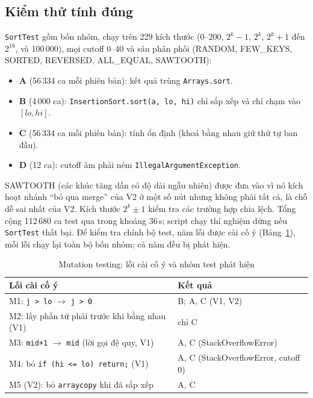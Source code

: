 \documentclass[11pt,a4paper]{article}
\begin{document}
\subsection{Kiểm thử tính đúng}
\texttt{SortTest} gồm bốn nhóm, chạy trên 229 kích thước (0--200, $2^k-1$, $2^k$, $2^k+1$ đến $2^{16}$, và
100\,000), mọi cutoff 0--40 và sáu phân phối (RANDOM, FEW\_KEYS, SORTED, REVERSED, ALL\_EQUAL, SAWTOOTH):
\begin{itemize}
\item \textbf{A} (56\,334 ca mỗi phiên bản): kết quả trùng \texttt{Arrays.sort}.
\item \textbf{B} (4\,000 ca): \texttt{InsertionSort.sort(a, lo, hi)} chỉ sắp xếp và chỉ chạm vào $[lo, hi]$.
\item \textbf{C} (56\,334 ca mỗi phiên bản): tính ổn định (khoá bằng nhau giữ thứ tự ban đầu).
\item \textbf{D} (12 ca): cutoff âm phải ném \texttt{IllegalArgumentException}.
\end{itemize}
SAWTOOTH (các khúc tăng dần có độ dài ngẫu nhiên) được đưa vào vì nó kích hoạt nhánh ``bỏ qua merge''
của V2 ở một số nút nhưng không phải tất cả, là chỗ dễ sai nhất của V2. Kích thước $2^k \pm 1$ kiểm tra
các trường hợp chia lệch. Tổng cộng 112\,680 ca test qua trong khoảng 36\,s; script chạy thí nghiệm dừng
nếu \texttt{SortTest} thất bại. Để kiểm tra chính bộ test, năm lỗi được cài cố ý (Bảng~\ref{tab:mutation}),
mỗi lỗi chạy lại toàn bộ bốn nhóm; cả năm đều bị phát hiện.

\begin{table}[H]
\centering
\small
\begin{tabular}{>{\raggedright}p{}>{\raggedright\arraybackslash}p{}}
\toprule
Lỗi cài cố ý & Kết quả \\
\midrule
M1: \texttt{j > lo} $\to$ \texttt{j > 0} & B; A, C (V1, V2) \\
M2: lấy phần tử phải trước khi bằng nhau (V1) & chỉ C \\
M3: \texttt{mid+1} $\to$ \texttt{mid} (lời gọi đệ quy, V1) & A, C (StackOverflowError) \\
M4: bỏ \texttt{if (hi <= lo) return;} (V1) & A, C (StackOverflowError, cutoff 0) \\
M5 (V2): bỏ \texttt{arraycopy} khi đã sắp xếp & A, C \\
\bottomrule
\end{tabular}
\caption{Mutation testing: lỗi cài cố ý và nhóm test phát hiện}
\label{tab:mutation}
\end{table}
\end{document}
